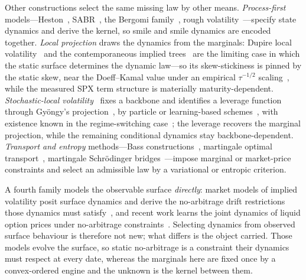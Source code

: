 \documentclass[11pt]{article}
\providecommand{\1}{\mathbf 1}
\begin{document}
Other constructions select the same missing law by other means. \emph{Process-first}
models---Heston~\cite{heston1993}, SABR~\cite{hagan2002}, the Bergomi
family~\cite{bergomi2009,bergomi2016}, rough
volatility~\cite{gatheral2018rough,bayerfrizgatheral2016}---specify state dynamics and derive the
kernel, so smile and smile dynamics are encoded together. \emph{Local projection} draws the dynamics
from the marginals: Dupire local volatility~\cite{dupire1994} and the contemporaneous implied
trees~\cite{dermankani1994,rubinstein1994} are the limiting case in which the static surface
determines the dynamic law---so its skew-stickiness is pinned by the static skew, near the
Doeff--Kamal value under an empirical $\tau^{-1/2}$ scaling~\cite{doeffkamal2012}, while the measured
SPX term structure is materially maturity-dependent. \emph{Stochastic-local volatility}~\cite{jex1999,lipton2002,ren2007}
fixes a backbone and identifies a leverage function through Gy\"ongy's
projection~\cite{gyongy1986}, by particle or learning-based schemes~\cite{guyonhl2012,cuchiero2020},
with existence known in the regime-switching case~\cite{jourdain2020};
the leverage recovers the marginal projection, while the remaining conditional dynamics stay
backbone-dependent. \emph{Transport and entropy} methods---Bass
constructions~\cite{conzehl2021,qin2024bass}, martingale optimal
transport~\cite{backhoff2020,guo2022ot}, martingale Schr\"odinger bridges~\cite{guyon2025siam}---impose
marginal or market-price constraints and select an admissible law by a variational or entropic
criterion.

A fourth family models the observable surface \emph{directly}: market models of implied volatility
posit surface dynamics and derive the no-arbitrage drift restrictions those dynamics must
satisfy~\cite{schonbucher1999,contdafonseca2002}, and recent work learns the joint dynamics of
liquid option prices under no-arbitrage constraints~\cite{cohenreisingerwang2021}. Selecting
dynamics from observed surface behaviour is therefore not new; what differs is the object carried.
Those models evolve the surface, so static no-arbitrage is a constraint their dynamics must respect
at every date, whereas the marginals here are fixed once by a convex-ordered engine and the unknown
is the kernel between them.
\end{document}
